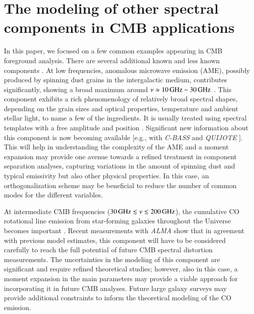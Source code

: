 \documentclass[usenatbib]{mn2e}
\begin{document}

\vspace{0mm}
\section{The modeling of other spectral components in CMB applications} 
\label{sec:other}
%
In this paper, we focused on a few common examples appearing in CMB foreground analysis. There are several additional known and less known components \citep[see][for some overview]{deZotti2015, PlanckSM2015}. 
%
At low frequencies, anomalous microwave emission (AME), possibly produced by spinning dust grains in the intergalactic medium, contributes significantly, showing a broad maximum around $\nu\simeq 10\,{\rm GHz}-30\,{\rm GHz}$ \citep[e.g.,][]{Draine1998, Yacine2009, Hoang2016}. This component exhibits a rich phenomenology of relatively broad spectral shapes, depending on the grain sizes and optical properties, temperature and ambient stellar light, to name a few of the ingredients. It is usually treated using spectral templates with a free amplitude and position \citep{PlanckSM2015}. Significant new information about this component is now becoming available [e.g., with {\it C-BASS} \citep{Irfan2015} and {\it QUIJOTE} \citep{GSantos2015}]. This will help in understanding the complexity of the AME and a moment expansion may provide one avenue towards a refined treatment in component separation analyses, capturing variations in the amount of spinning dust and typical emissivity but also other physical properties. In this case, an orthogonalization scheme may be beneficial to reduce the number of common modes for the different variables. 
%
 
At intermediate CMB frequencies ($30\,{\rm GHz}\lesssim \nu \lesssim 200\,{\rm GHz}$), the cumulative CO rotational line emission from star-forming galaxies throughout the Universe becomes important \citep{Righi2008b, deZotti2015, Mashian2016}. Recent measurements with {\it ALMA} \citep{Carilli2016} show that in agreement with previous model estimates, this component will have to be considered carefully to reach the full potential of future CMB spectral distortion measurements.
The uncertainties in the modeling of this component are significant and require refined theoretical studies; however, also in this case, a moment expansion in the main parameters may provide a viable approach for incorporating it in future CMB analyses. Future large galaxy surveys may provide additional constraints to inform the theoretical modeling of the CO emission. 
\end{document}
